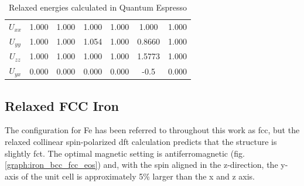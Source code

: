 \begin{landscape}
\begin{table}[h]
\begin{center}
\begin{tabular}{c c c c c c c}
$U_{xx}$                   & 1.000           & 1.000            & 1.000              & 1.000              & 1.000            & 1.000           \\
$U_{yy}$                   & 1.000           & 1.000            & 1.054              & 1.000               & 0.8660            & 1.000          \\
$U_{zz}$                   & 1.000           & 1.000            & 1.000              & 1.000                & 1.5773            & 1.000         \\
$U_{yx}$                   & 0.000           & 0.000            & 0.000              & 0.000                & -0.5            & 0.000         \\
\hline\hline
\end{tabular}
\end{center}
\caption{Relaxed energies calculated in Quantum Espresso}
\label{table:relaxedenergies}
\end{table}

\end{landscape}
\clearpage




\subsection{Relaxed FCC Iron}
\label{section:fcc-iron}

The configuration for Fe has been referred to throughout this work as \acrshort{fcc}, but the relaxed collinear spin-polarized \acrshort{dft} calculation predicts that the structure is slightly \acrfull{fct}.  The optimal magnetic setting is antiferromagnetic (fig. \ref{graph:iron_bcc_fcc_eos}) and, with the spin aligned in the z-direction, the y-axis of the unit cell is approximately 5\% larger than the x and z axis.

